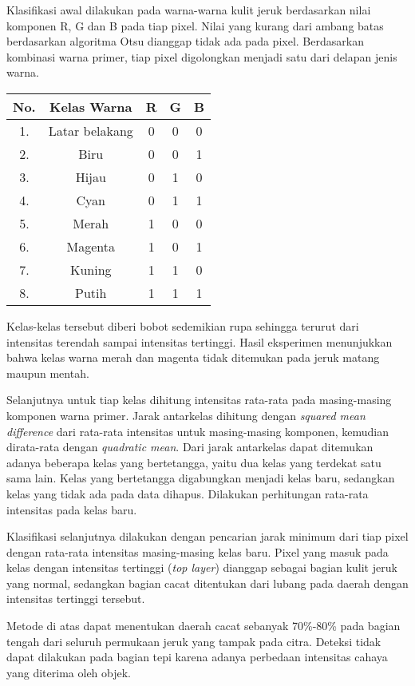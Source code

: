 \documentclass[laporan.tex]{subfiles}
\begin{document}
Klasifikasi awal dilakukan pada warna-warna kulit jeruk berdasarkan nilai komponen R, G dan B pada tiap pixel. Nilai yang kurang dari ambang batas berdasarkan algoritma Otsu dianggap tidak ada pada pixel. Berdasarkan kombinasi warna primer, tiap pixel digolongkan menjadi satu dari delapan jenis warna.

\begin{tabular}{|c|c|c|c|c|}
\hline
No. & Kelas Warna & R & G & B \\
\hline
1. & Latar belakang & 0 & 0 & 0 \\
2. & Biru & 0 & 0 & 1 \\
3. & Hijau & 0 & 1 & 0 \\
4. & Cyan & 0 & 1 & 1 \\
5. & Merah & 1 & 0 & 0 \\
6. & Magenta & 1 & 0 & 1 \\
7. & Kuning & 1 & 1 & 0 \\
8. & Putih & 1 & 1 & 1 \\
\hline
\end{tabular}

Kelas-kelas tersebut diberi bobot sedemikian rupa sehingga terurut dari intensitas terendah sampai intensitas tertinggi. Hasil eksperimen menunjukkan bahwa kelas warna merah dan magenta tidak ditemukan pada jeruk matang maupun mentah.

Selanjutnya untuk tiap kelas dihitung intensitas rata-rata pada masing-masing komponen warna primer. Jarak antarkelas dihitung dengan \emph{squared mean difference} dari rata-rata intensitas untuk masing-masing komponen, kemudian dirata-rata dengan \emph{quadratic mean}. Dari jarak antarkelas dapat ditemukan adanya beberapa kelas yang bertetangga, yaitu dua kelas yang terdekat satu sama lain. Kelas yang bertetangga digabungkan menjadi kelas baru, sedangkan kelas yang tidak ada pada data dihapus. Dilakukan perhitungan rata-rata intensitas pada kelas baru.

Klasifikasi selanjutnya dilakukan dengan pencarian jarak minimum dari tiap pixel dengan rata-rata intensitas masing-masing kelas baru. Pixel yang masuk pada kelas dengan intensitas tertinggi (\emph{top layer}) dianggap sebagai bagian kulit jeruk yang normal, sedangkan bagian cacat ditentukan dari lubang pada daerah dengan intensitas tertinggi tersebut.

Metode di atas dapat menentukan daerah cacat sebanyak 70\%-80\% pada bagian tengah dari seluruh permukaan jeruk yang tampak pada citra. Deteksi tidak dapat dilakukan pada bagian tepi karena adanya perbedaan intensitas cahaya yang diterima oleh objek.
\end{document}
